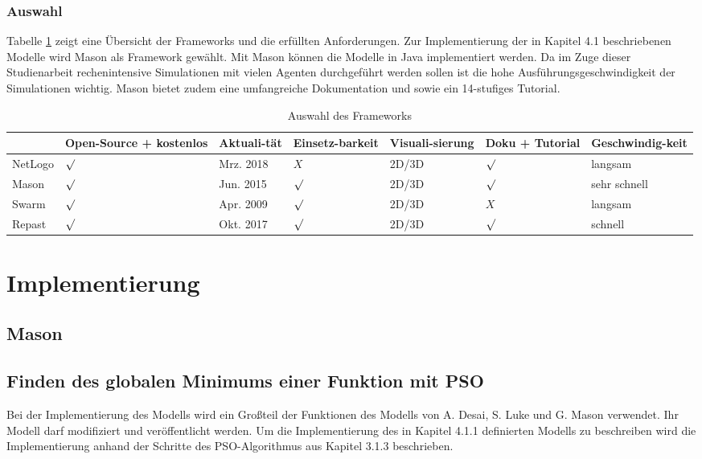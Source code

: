 \documentclass[a4paper, 11pt]{article}
\begin{document}
\subsubsection{Auswahl}
Tabelle \ref{tabframework} zeigt eine Übersicht der Frameworks und die erfüllten Anforderungen.
Zur Implementierung der in Kapitel 4.1 beschriebenen Modelle wird Mason als Framework gewählt. Mit Mason können die Modelle in Java implementiert werden. Da im Zuge dieser Studienarbeit rechenintensive Simulationen mit vielen Agenten durchgeführt werden sollen ist die hohe Ausführungsgeschwindigkeit der Simulationen wichtig. Mason bietet zudem eine umfangreiche Dokumentation und sowie ein 14-stufiges Tutorial. 
\begin{table}[h]
	\begin{tabular}{p{1.5cm}|p{1.5cm}|p{1.6cm}|p{1.7cm}|p{1.3cm}|p{1.3cm}|p{2.7cm}}
		& Open-Source + kostenlos & Aktuali-tät & Einsetz-barkeit & Visuali-sierung & Doku + Tutorial & Geschwindig-keit\\ \hline\hline
		NetLogo & $\surd$ & Mrz. 2018 & $X$ & 2D/3D & $\surd$ & langsam\\ \hline
		Mason & $\surd$ & Jun. 2015 & $\surd$ & 2D/3D & $\surd$ & sehr schnell\\ \hline
		Swarm & $\surd$  & Apr. 2009 & $\surd$ & 2D/3D & $X$ & langsam\\ \hline
		Repast & $\surd$ & Okt. 2017 & $\surd$ & 2D/3D & $\surd$ & schnell\\ \hline
	\end{tabular}
	\caption{Auswahl des Frameworks}
	\label{tabframework}
\end{table}
\newpage
\section{Implementierung}
\subsection{Mason}

\subsection{Finden des globalen Minimums einer Funktion mit \acs{PSO}}
Bei der Implementierung des Modells wird ein Großteil der Funktionen des Modells von A. Desai, S. Luke und G. Mason verwendet. Ihr Modell darf modifiziert und veröffentlicht werden. Um die Implementierung des in Kapitel 4.1.1 definierten Modells zu beschreiben wird die Implementierung anhand der Schritte des \acs{PSO}-Algorithmus aus Kapitel 3.1.3 beschrieben.
\end{document}

